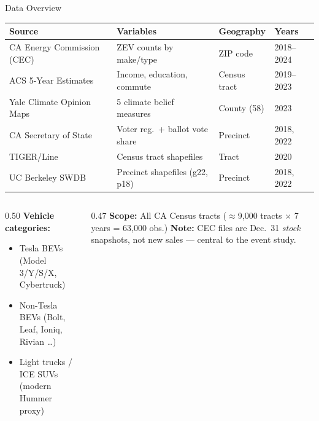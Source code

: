\documentclass[aspectratio=169,t]{beamer}
\begin{document}
\begin{frame}{Data Overview}
  \centering\footnotesize
  \begin{tabular}{llll}
    \toprule
    \textbf{Source} & \textbf{Variables} & \textbf{Geography} & \textbf{Years} \\
    \midrule
    CA Energy Commission (CEC) & ZEV counts by make/type & ZIP code & 2018--2024 \\
    ACS 5-Year Estimates & Income, education, commute & Census tract & 2019--2023 \\
    Yale Climate Opinion Maps & 5 climate belief measures & County (58) & 2023 \\
    CA Secretary of State & Voter reg.\ + ballot vote share & Precinct & 2018, 2022 \\
    TIGER/Line & Census tract shapefiles & Tract & 2020 \\
    UC Berkeley SWDB & Precinct shapefiles (g22, p18) & Precinct & 2018, 2022 \\
    \bottomrule
  \end{tabular}

  \begin{columns}[T]
    \begin{column}{0.50\textwidth}
      \footnotesize\textbf{Vehicle categories:}
      \begin{itemize}
        \item Tesla BEVs (Model 3/Y/S/X, Cybertruck)
        \item Non-Tesla BEVs (Bolt, Leaf, Ioniq, Rivian \ldots)
        \item Light trucks / ICE SUVs (modern Hummer proxy)
      \end{itemize}
    \end{column}
    \begin{column}{0.47\textwidth}
      \footnotesize\textbf{Scope:} All CA Census tracts
      ($\approx$9,000 tracts $\times$ 7 years = 63,000 obs.)
      \textbf{Note:} CEC files are Dec.\ 31 \textit{stock} snapshots,
      not new sales --- central to the event study.
    \end{column}
  \end{columns}
\end{frame}
\end{document}
